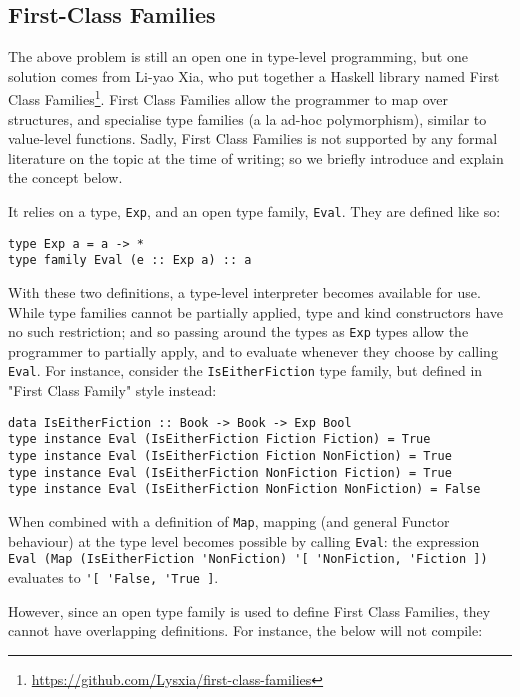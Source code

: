\documentclass[12pt, a4paper, bibliography=totocnumbered]{scrreprt}
\newcommand{\inline}[1]{\lstinline[basicstyle=\ttfamily\footnotesize]{#1}}
\begin{document}
\subsection{First-Class Families}

The above problem is still an open one in type-level programming, but one solution comes from Li-yao Xia, who put together a Haskell library named First Class Families\footnote{\url{https://github.com/Lysxia/first-class-families}}. First Class Families allow the programmer to map over structures, and specialise type families (a la ad-hoc polymorphism), similar to value-level functions. Sadly, First Class Families is not supported by any formal literature on the topic at the time of writing; so we briefly introduce and explain the concept below.

It relies on a type, \inline{Exp}, and an open type family, \inline{Eval}. They are defined like so:

\begin{lstlisting}
type Exp a = a -> *
type family Eval (e :: Exp a) :: a
\end{lstlisting}

With these two definitions, a type-level interpreter becomes available for use. While type families cannot be partially applied, type and kind constructors have no such restriction; and so passing around the types as \inline{Exp} types allow the programmer to partially apply, and to evaluate whenever they choose by calling \inline{Eval}. For instance, consider the \inline{IsEitherFiction} type family, but defined in "First Class Family" style instead:

\begin{lstlisting}
data IsEitherFiction :: Book -> Book -> Exp Bool
type instance Eval (IsEitherFiction Fiction Fiction) = True
type instance Eval (IsEitherFiction Fiction NonFiction) = True
type instance Eval (IsEitherFiction NonFiction Fiction) = True
type instance Eval (IsEitherFiction NonFiction NonFiction) = False
\end{lstlisting}

When combined with a definition of \inline{Map}, mapping (and general Functor behaviour) at the type level becomes possible by calling \inline{Eval}: the expression \inline{Eval (Map (IsEitherFiction 'NonFiction) '[ 'NonFiction, 'Fiction ])} evaluates to \inline{'[ 'False, 'True ]}.

However, since an open type family is used to define First Class Families, they cannot have overlapping definitions. For instance, the below will not compile:
\end{document}
